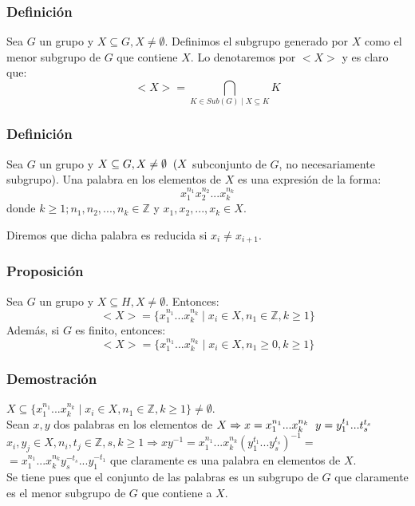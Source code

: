 \documentclass[11pt,a4paper]{article}
\begin{document}
\subsubsection*{Definición}

Sea $G$ un grupo y $X \subseteq G, X \neq \emptyset$. Definimos el subgrupo generado por $X$ como el menor subgrupo de $G$ que contiene $X$. Lo denotaremos por $<X>$ y es claro que:
$$<X> = \bigcap\limits_{K \in Sub(G) \mid X \subseteq K} K$$

\subsubsection*{Definición}

Sea $G$ un grupo y $X \subseteq G, X \neq \emptyset \hspace{0.2cm} (X$ subconjunto de $G$, no necesariamente subgrupo). Una palabra en los elementos de $X$ es una expresión de la forma:
$$x_{1}^{n_{1}}x_{2}^{n_{2}}...x_{k}^{n_{k}}$$
donde $k \geq 1; n_{1}, n_{2}, ..., n_{k} \in \mathbb{Z}$ y $x_{1}, x_{2}, ..., x_{k} \in X$.

Diremos que dicha palabra es reducida si $x_{i} \neq x_{i+1}$.

\subsubsection*{Proposición}

Sea $G$ un grupo y $X \subseteq H, X \neq \emptyset$. Entonces:
$$<X> = \{x_{1}^{n_{1}}...x_{k}^{n_{k}} \mid x_{i} \in X, n_{1} \in \mathbb{Z}, k \geq 1\}$$
Además, si $G$ es finito, entonces:
$$<X> = \{x_{1}^{n_{1}}...x_{k}^{n_{k}} \mid x_{i} \in X, n_{1} \geq 0, k \geq 1\}$$

\subsubsection*{Demostración}

$X \subseteq \{x_{1}^{n_{1}}...x_{k}^{n_{k}} \mid x_{i} \in X, n_{1} \in \mathbb{Z}, k \geq 1\} \neq \emptyset$. \\
Sean $x, y$ dos palabras en los elementos de $X \Rightarrow x = x_{1}^{n_{1}}...x_{k}^{n_{k}} \hspace{0.2cm} y = y_{1}^{t_{1}} ... t_{s}^{t_{s}}$ \\ $x_{i}, y_{j} \in X, n_{i}, t_{j} \in \mathbb{Z}, s,k \geq 1 \Rightarrow xy^{-1} = x_{1}^{n_{1}} ... x_{k}^{n_{k}} (y_{1}^{t_{1}} ... y_{s}^{t_{s}})^{-1} =$ \\ $= x_{1}^{n_{1}} ... x_{k}^{n_{k}} y_{s}^{-t_{s}} ... y_{1}^{-t_{1}}$ que claramente es una palabra en elementos de $X$. \\
Se tiene pues que el conjunto de las palabras es un subgrupo de $G$ que claramente es el menor subgrupo de $G$ que contiene a $X$.
\end{document}
